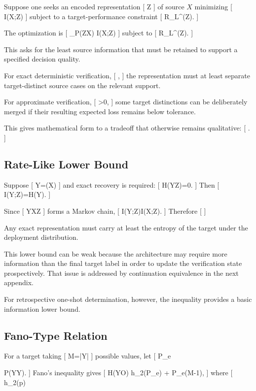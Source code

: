 \documentclass[11pt]{article}
\begin{document}
Suppose one seeks an encoded representation
[
Z
]
of source $X$ minimizing
[
I(X;Z)
]
subject to a target-performance constraint
[
R_L^\star(Z)\leq\varepsilon.
]

The optimization is
[
\inf_{P(Z\mid X)}
I(X;Z)
]
subject to
[
R_L^\star(Z)\leq\varepsilon.
]

This asks for the least source information that must be retained to support a specified decision quality.

For exact deterministic verification,
[
,
]
the representation must at least separate target-distinct source cases on the relevant support.

For approximate verification,
[
\varepsilon>0,
]
some target distinctions can be deliberately merged if their resulting expected loss remains below tolerance.

This gives mathematical form to a tradeoff that otherwise remains qualitative:
[
\quad\leftrightarrow\quad
{}.
]

\subsection{Rate-Like Lower Bound}

Suppose
[
Y=\Phi(X)
]
and exact recovery is required:
[
H(Y\mid Z)=0.
]
Then
[
I(Y;Z)=H(Y).
]

Since
[
Y\to X\to Z
]
forms a Markov chain,
[
I(Y;Z)\leq I(X;Z).
]
Therefore
[
]

Any exact representation must carry at least the entropy of the target under the deployment distribution.

This lower bound can be weak because the architecture may require more information than the final target label in order to update the verification state prospectively. That issue is addressed by continuation equivalence in the next appendix.

For retrospective one-shot determination, however, the inequality provides a basic information lower bound.

\subsection{Fano-Type Relation}

For a target taking
[
M=|\mathcal Y|
]
possible values, let
[
P_e

P(\widehat Y\neq Y).
]
Fano's inequality gives
[
H(Y\mid O)
\leq
h_2(P_e)
+
P_e\log(M-1),
]
where
[
h_2(p)
\end{document}
